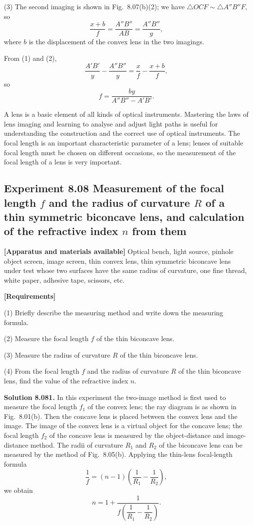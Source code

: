(3) The second imaging is shown in Fig.~8.07(b)(2); we have $\triangle OCF\sim\triangle A''B''F$, so
\begin{equation}
\frac{x+b}{f}=\frac{A''B''}{AB}=\frac{A''B''}{y}, \tag{2}
\end{equation}
where $b$ is the displacement of the convex lens in the two imagings.

From (1) and (2),
\[
\frac{A'B'}{y}-\frac{A''B''}{y}=\frac{x}{f}-\frac{x+b}{f},
\]
so
\[
f=\frac{by}{A''B''-A'B'}.
\]

\begin{commentary}
A lens is a basic element of all kinds of optical instruments. Mastering the laws of lens imaging and learning to analyse and adjust light paths is useful for understanding the construction and the correct use of optical instruments. The focal length is an important characteristic parameter of a lens; lenses of suitable focal length must be chosen on different occasions, so the measurement of the focal length of a lens is very important.
\end{commentary}

\subsection*{Experiment 8.08 \quad Measurement of the focal length $f$ and the radius of curvature $R$ of a thin symmetric biconcave lens, and calculation of the refractive index $n$ from them}

\textbf{[Apparatus and materials available]} Optical bench, light source, pinhole object screen, image screen, thin convex lens, thin symmetric biconcave lens under test whose two surfaces have the same radius of curvature, one fine thread, white paper, adhesive tape, scissors, etc.

\textbf{[Requirements]}

(1) Briefly describe the measuring method and write down the measuring formula.

(2) Measure the focal length $f$ of the thin biconcave lens.

(3) Measure the radius of curvature $R$ of the thin biconcave lens.

(4) From the focal length $f$ and the radius of curvature $R$ of the thin biconcave lens, find the value of the refractive index $n$.

\textbf{Solution 8.08}\quad \textbf{1.} In this experiment the two-image method is first used to measure the focal length $f_1$ of the convex lens; the ray diagram is as shown in Fig.~8.01(b). Then the concave lens is placed between the convex lens and the image. The image of the convex lens is a virtual object for the concave lens; the focal length $f_2$ of the concave lens is measured by the object-distance and image-distance method. The radii of curvature $R_1$ and $R_2$ of the biconcave lens can be measured by the method of Fig.~8.05(b). Applying the thin-lens focal-length formula
\[
\frac{1}{f}=(n-1)\left(\frac{1}{R_1}-\frac{1}{R_2}\right),
\]
we obtain
\[
n=1+\frac{1}{f\left(\dfrac{1}{R_1}-\dfrac{1}{R_2}\right)}.
\]

